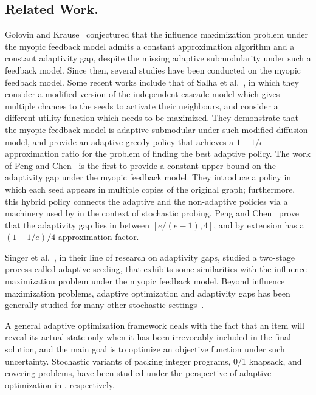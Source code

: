 \subsection*{Related Work.}
Golovin and Krause~\cite{Golovin2011a} conjectured that the influence maximization problem under the myopic feedback model admits a constant approximation algorithm and a constant adaptivity gap, despite the missing adaptive submodularity under such a feedback model. Since then, several studies have been conducted on the myopic feedback model. Some recent works include that of Salha et al.~\cite{Salha2018}, in which they consider a modified version of the independent cascade model which gives multiple chances to the seeds to activate their  neighbours, and  consider a different utility function which needs to be maximized. They demonstrate that the myopic feedback model is adaptive submodular under such modified diffusion model, and provide an adaptive greedy policy that achieves a $1-1/e$ approximation ratio for the problem of finding the best adaptive policy. The work of Peng and Chen~\cite{Peng2019} is the first to provide a constant upper bound on the adaptivity gap under the myopic feedback model. They introduce a policy in which each seed appears in multiple copies of the original graph; furthermore, this hybrid policy connects the adaptive and the non-adaptive policies via a  machinery used by \cite{Gupta2016,Gupta2017,Bradac19} in the context of stochastic probing. Peng and Chen~\cite{Peng2019} prove that the adaptivity gap lies in between $\left[e/(e-1),4\right]$, and by extension has a $(1-1/e)/4$ approximation factor. 

Singer et al.~\cite{Badanidiyuru2016,Rubinstein2015, Seeman2013, Singer2016}, in their line of research on adaptivity gaps, studied a two-stage process called adaptive seeding, that exhibits some similarities with the influence maximization problem under the myopic feedback model. Beyond influence maximization problems, adaptive optimization and adaptivity gaps has been generally studied for many other stochastic settings~\cite{DBLP:conf/stacs/AdamczykSW14,Asadpour16, DBLP:conf/wine/AsadpourNS08, Bradac19,DBLP:journals/mor/ChanF09,   DBLP:conf/soda/DeanGV05, DBLP:journals/mor/DeanGV08,DBLP:conf/latin/GoemansV06,   Golovin2011a,DBLP:conf/icml/GuilloryB10, Gupta2016,Gupta2017,DBLP:conf/ciac/HellersteinKL15,DBLP:journals/corr/abs-1803-07639,Bradac19}.

A general adaptive optimization framework deals with the fact that an item will reveal its actual state only when it has been irrevocably included in the final solution, and the main goal is to optimize an objective function under such uncertainty. Stochastic variants of packing integer programs, 0/1 knapsack, and covering problems, have been studied under the perspective of adaptive optimization in \cite{DBLP:conf/soda/DeanGV05, DBLP:journals/mor/DeanGV08,DBLP:conf/latin/GoemansV06}, respectively.

